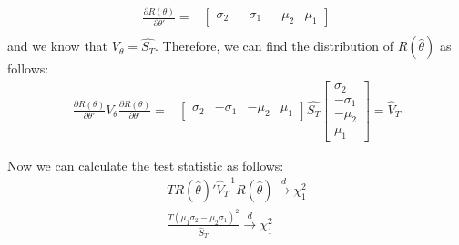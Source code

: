 \begin{enumerate}[(a)]
\begin{equation*}
\begin{aligned}
    \frac{\partial R(\theta)}{\partial \theta'} = & \begin{bmatrix}
      \sigma_2 & -\sigma_1 & -\mu_2 & \mu_1
    \end{bmatrix} \\
  \end{aligned}
\end{equation*}
and we know that $V_{\theta} = \hat{S_T}$. Therefore, we can find the distribution of $R(\hat{\theta})$ as follows:
\begin{equation*}
\begin{aligned}
  \frac{\partial R(\theta)}{\partial \theta'}V_{\theta}\frac{\partial R(\theta)}{\partial \theta'} = & \begin{bmatrix}
    \sigma_2 & -\sigma_1 & -\mu_2 & \mu_1
  \end{bmatrix} \hat{S_T} \begin{bmatrix}
    \sigma_2 \\
    -\sigma_1 \\
    -\mu_2 \\
    \mu_1
  \end{bmatrix}  = \hat{V}_T
\end{aligned}
\end{equation*}

Now we can calculate the test statistic as follows:
\begin{equation*}
  \begin{aligned}
    T R(\hat{\theta})' \hat{V}_T^{-1} R(\hat{\theta}) \xrightarrow{d} \chi^2_1 \\
    \frac{T(\mu_1\sigma_2 - \mu_2\sigma_1)^2}{\hat{S}_T} \xrightarrow{d} \chi^2_1 \\
  \end{aligned}
\end{equation*}


\end{enumerate}
